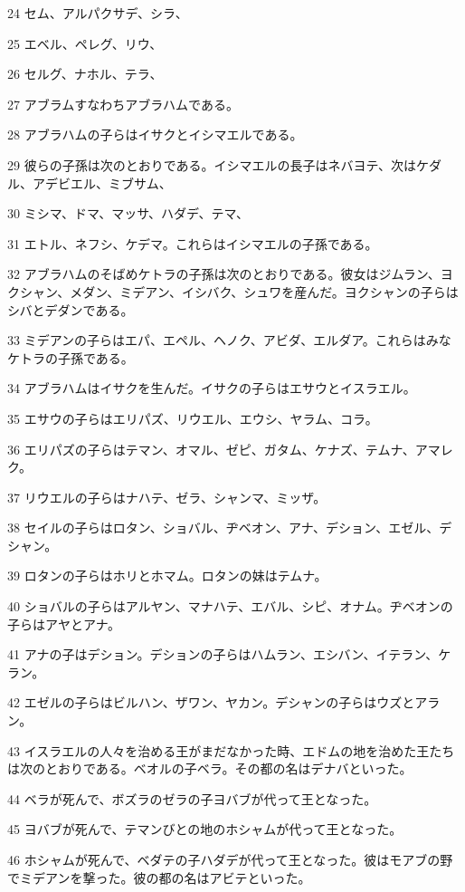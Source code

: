 \par 24 セム、アルパクサデ、シラ、
\par 25 エベル、ペレグ、リウ、
\par 26 セルグ、ナホル、テラ、
\par 27 アブラムすなわちアブラハムである。
\par 28 アブラハムの子らはイサクとイシマエルである。
\par 29 彼らの子孫は次のとおりである。イシマエルの長子はネバヨテ、次はケダル、アデビエル、ミブサム、
\par 30 ミシマ、ドマ、マッサ、ハダデ、テマ、
\par 31 エトル、ネフシ、ケデマ。これらはイシマエルの子孫である。
\par 32 アブラハムのそばめケトラの子孫は次のとおりである。彼女はジムラン、ヨクシャン、メダン、ミデアン、イシバク、シュワを産んだ。ヨクシャンの子らはシバとデダンである。
\par 33 ミデアンの子らはエパ、エペル、ヘノク、アビダ、エルダア。これらはみなケトラの子孫である。
\par 34 アブラハムはイサクを生んだ。イサクの子らはエサウとイスラエル。
\par 35 エサウの子らはエリパズ、リウエル、エウシ、ヤラム、コラ。
\par 36 エリパズの子らはテマン、オマル、ゼピ、ガタム、ケナズ、テムナ、アマレク。
\par 37 リウエルの子らはナハテ、ゼラ、シャンマ、ミッザ。
\par 38 セイルの子らはロタン、ショバル、ヂベオン、アナ、デション、エゼル、デシャン。
\par 39 ロタンの子らはホリとホマム。ロタンの妹はテムナ。
\par 40 ショバルの子らはアルヤン、マナハテ、エバル、シピ、オナム。ヂベオンの子らはアヤとアナ。
\par 41 アナの子はデション。デションの子らはハムラン、エシバン、イテラン、ケラン。
\par 42 エゼルの子らはビルハン、ザワン、ヤカン。デシャンの子らはウズとアラン。
\par 43 イスラエルの人々を治める王がまだなかった時、エドムの地を治めた王たちは次のとおりである。ベオルの子ベラ。その都の名はデナバといった。
\par 44 ベラが死んで、ボズラのゼラの子ヨバブが代って王となった。
\par 45 ヨバブが死んで、テマンびとの地のホシャムが代って王となった。
\par 46 ホシャムが死んで、ベダテの子ハダデが代って王となった。彼はモアブの野でミデアンを撃った。彼の都の名はアビテといった。
